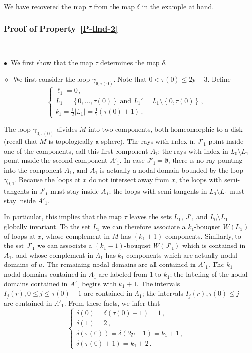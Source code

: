 \documentclass[12pt,a4paper]{amsart}
\theoremstyle{plain} %
\theoremstyle{definition}
\numberwithin{equation}{section}
\numberwithin{figure}{section}
\numberwithin{table}{section}
\newcommand{\sm}{\!\setminus\!}
\newcommand{\set}[1]{\left\lbrace #1 \right\rbrace}
\newcommand{\noib}{\noindent $\bullet$~}
\newcommand{\noid}{\noindent $\diamond$~}
\begin{document}
We have recovered the map $\tau$ from the map $\delta$ in the example at hand.


\subsubsection{Proof of Property~\ref{P-llnd-2}}~

\noib We first show that the map $\tau$ determines the map $\delta$. \smallskip

\noid We first consider the loop $\gamma_{0,\tau(0)}$. Note that $0 < \tau(0) \le 2p-3$. Define
%
\begin{equation}\label{E-llnd-9}
\left\{
\begin{array}{l}
\ell_1 = 0\,,\\[5pt]
L_1 = \set{0,\ldots,\tau(0)} \text{~and~} L_1' = L_1\sm \set{0,\tau(0)}\,,\\[5pt]
k_1 = \frac{1}{2}|L_1| = \frac{1}{2}\left(\tau(0) +1 \right)\,.
\end{array}%
\right.
\end{equation}

The loop $\gamma_{0,\tau(0)}$ divides $M$ into two components, both homeomorphic to a disk (recall that $M$ is topologically a sphere). The rays with index in $J'_1$ point inside one of the components, call this first component $A_1$; the rays with index in $L_0\sm L_1$ point inside the second component $A'_1$. In case $J'_1=\emptyset$, there is no ray pointing into the component $A_1$, and $A_1$ is actually a nodal domain bounded by the loop $\gamma_{0,1}$. Because the loops at $x$ do not intersect away from $x$, the loops with semi-tangents in $J'_1$ must stay inside $A_1$; the loops with semi-tangents in $L_0\sm L_1$ must stay inside $A'_1$.\smallskip

In particular, this implies that the map $\tau$ leaves the sets $L_1$, $J'_1$ and $L_0\sm L_1$ globally invariant. To the set $L_1$ we can therefore associate a $k_1$-bouquet $W(L_1)$ of loops at $x$, whose complement in $M$ has $(k_1+1)$ components. Similarly, to the set $J'_1$ we can associate a $(k_1-1)$-bouquet $W(J'_1)$ which is contained in $A_1$, and whose complement in $A_1$ has $k_1$ components which are actually nodal domains of $u$. The remaining nodal domains are all contained in $A'_1$. The $k_1$ nodal domains contained in $A_1$ are labeled from $1$ to $k_1$; the labeling of the nodal domains contained in $A'_1$ begins with $k_1+1$. The intervals $I_j(r), 0 \le j \le \tau(0)-1$ are contained in $A_1$; the intervals $I_j(r), \tau(0) \le j$ are contained in $A'_1$. From these facts, we infer that
%
\begin{equation}\label{E-llnd-10}
\left\{
\begin{array}{l}
\delta(0) = \delta(\tau(0)-1) = 1\,,\\[5pt]
\delta(1) = 2\,,\\[5pt]
\delta(\tau(0)) = \delta(2p-1) = k_1+1\,,\\[5pt]
\delta(\tau(0)+1) = k_1+2\,.
\end{array}%
\right.
\end{equation}
\medskip
\end{document}

